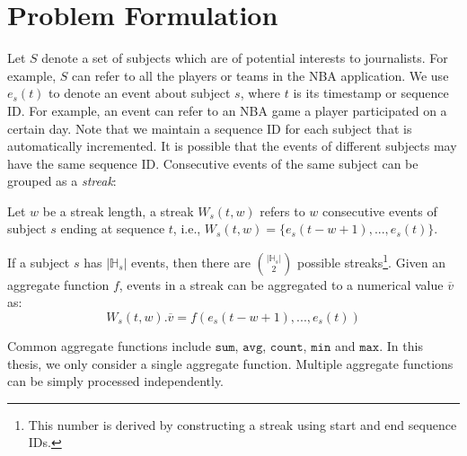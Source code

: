 \section{Problem Formulation}\label{sec:problem_definition}
Let $S$ denote a set of subjects which are of potential interests to journalists. 
For example, $S$ can refer to all the players or teams in the NBA application.
We use $e_s(t)$ to denote an event about subject $s$, where $t$ is its timestamp or sequence ID. 
For example, an event can refer to an NBA game a player participated on a certain day. 
Note that we maintain a sequence ID for each subject that is automatically incremented. 
It is possible that the events of different subjects may have the same sequence ID. 
Consecutive events of the same subject can be grouped as a \textit{streak}:

\begin{definition}
Let $w$ be a streak length, a streak $W_s(t,w)$ refers to $w$ consecutive 
events of subject $s$ ending at sequence $t$, i.e., $W_s(t,w)=\{e_s(t-w+1),..., e_s(t)\}$.
\end{definition}

If a subject $s$ has $|\mathbb{H}_s|$ events, 
then there are $|\mathbb{H}_s|\choose{2}$ possible 
streaks\footnote{This number is derived by constructing a
streak using start and end sequence IDs.
}. 
Given an aggregate function $f$, events in a streak can be aggregated to a numerical value $\overline{v}$ as:
$$W_s(t,w).\overline{v} = f(e_s(t-w+1),..., e_s(t))$$


Common aggregate functions include $\mathtt{sum}$, $\mathtt{avg}$, $\mathtt{count}$, $\mathtt{min}$ and $\mathtt{max}$. 
In this thesis, we only consider a single aggregate function. Multiple aggregate functions can be 
simply  processed independently.


